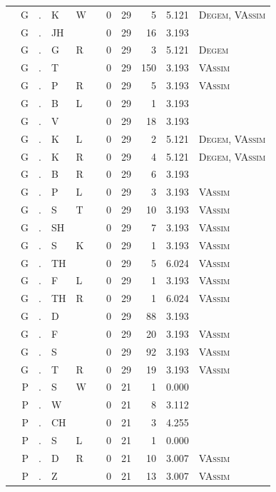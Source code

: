 \documentclass[12pt]{article}
\begin{document}
\begin{longtable}{r@{ } r@{ } c@{ } l@{ } l@{ } l@{ } r r r r l }
 & G & . & K & W &  & 0 & 29 & 5 & 5.121 & \textsc{Degem}, \textsc{VAssim} \\
 & G & . & JH &  &  & 0 & 29 & 16 & 3.193 &  \\
 & G & . & G & R &  & 0 & 29 & 3 & 5.121 & \textsc{Degem} \\
 & G & . & T &  &  & 0 & 29 & 150 & 3.193 & \textsc{VAssim} \\
 & G & . & P & R &  & 0 & 29 & 5 & 3.193 & \textsc{VAssim} \\
 & G & . & B & L &  & 0 & 29 & 1 & 3.193 &  \\
 & G & . & V &  &  & 0 & 29 & 18 & 3.193 &  \\
 & G & . & K & L &  & 0 & 29 & 2 & 5.121 & \textsc{Degem}, \textsc{VAssim} \\
 & G & . & K & R &  & 0 & 29 & 4 & 5.121 & \textsc{Degem}, \textsc{VAssim} \\
 & G & . & B & R &  & 0 & 29 & 6 & 3.193 &  \\
 & G & . & P & L &  & 0 & 29 & 3 & 3.193 & \textsc{VAssim} \\
 & G & . & S & T &  & 0 & 29 & 10 & 3.193 & \textsc{VAssim} \\
 & G & . & SH &  &  & 0 & 29 & 7 & 3.193 & \textsc{VAssim} \\
 & G & . & S & K &  & 0 & 29 & 1 & 3.193 & \textsc{VAssim} \\
 & G & . & TH &  &  & 0 & 29 & 5 & 6.024 & \textsc{VAssim} \\
 & G & . & F & L &  & 0 & 29 & 1 & 3.193 & \textsc{VAssim} \\
 & G & . & TH & R &  & 0 & 29 & 1 & 6.024 & \textsc{VAssim} \\
 & G & . & D &  &  & 0 & 29 & 88 & 3.193 &  \\
 & G & . & F &  &  & 0 & 29 & 20 & 3.193 & \textsc{VAssim} \\
 & G & . & S &  &  & 0 & 29 & 92 & 3.193 & \textsc{VAssim} \\
 & G & . & T & R &  & 0 & 29 & 19 & 3.193 & \textsc{VAssim} \\
 & P & . & S & W &  & 0 & 21 & 1 & 0.000 &  \\
 & P & . & W &  &  & 0 & 21 & 8 & 3.112 &  \\
 & P & . & CH &  &  & 0 & 21 & 3 & 4.255 &  \\
 & P & . & S & L &  & 0 & 21 & 1 & 0.000 &  \\
 & P & . & D & R &  & 0 & 21 & 10 & 3.007 & \textsc{VAssim} \\
 & P & . & Z &  &  & 0 & 21 & 13 & 3.007 & \textsc{VAssim} \\

\end{longtable}
\end{document}
